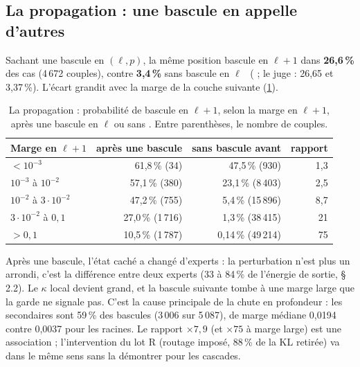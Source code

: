 \subsection{La propagation : une bascule en appelle d'autres}\label{t3tro:sec:propagation}

Sachant une bascule en $(\ell, p)$, la même position bascule en $\ell + 1$ dans \textbf{26,6\,\%} des cas (4\,672 couples), contre \textbf{3,4\,\%} sans bascule en $\ell$ \mes~( ; le juge : 26,65 et 3,37\,\%). L'écart grandit avec la marge de la couche suivante (\cref{t3tro:tab:propagation}).

\begin{table}[tbp]
\centering\small
\caption[La propagation des bascules]{La propagation : probabilité de bascule en $\ell + 1$, selon la marge en $\ell + 1$, après une bascule en $\ell$ ou sans \mes. Entre parenthèses, le nombre de couples.}
\label{t3tro:tab:propagation}
\begin{tabular}{@{}lrrr@{}}
\toprule
Marge en $\ell + 1$ & après une bascule & sans bascule avant & rapport \\
\midrule
$< 10^{-3}$ & 61,8\,\% (34) & 47,5\,\% (930) & 1,3 \\
$10^{-3}$ à $10^{-2}$ & 57,1\,\% (380) & 23,1\,\% (8\,403) & 2,5 \\
$10^{-2}$ à $3 \cdot 10^{-2}$ & 47,2\,\% (755) & 5,4\,\% (15\,896) & 8,7 \\
$3 \cdot 10^{-2}$ à $0{,}1$ & 27,0\,\% (1\,716) & 1,3\,\% (38\,415) & 21 \\
$> 0{,}1$ & 10,5\,\% (1\,787) & 0,14\,\% (49\,214) & 75 \\
\bottomrule
\end{tabular}
\end{table}

Après une bascule, l'état caché a changé d'experts : la perturbation n'est plus un arrondi, c'est la différence entre deux experts (33 à 84\,\% de l'énergie de sortie,  §\,2.2). Le $\kappa$ local devient grand, et la bascule suivante tombe à une marge large que la garde ne signale pas. C'est la cause principale de la chute en profondeur : les secondaires sont 59\,\% des bascules (3\,006 sur 5\,087), de marge médiane 0,0194 contre 0,0037 pour les racines. Le rapport $\times 7{,}9$ (et $\times 75$ à marge large) est une association ; l'intervention du lot R (routage imposé, 88\,\% de la KL retirée) va dans le même sens sans la démontrer pour les cascades.

